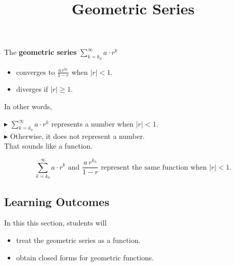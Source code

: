 \documentclass{ximera}
\title{Geometric Series}
\begin{document}
\begin{abstract}
\end{abstract}
\maketitle







\begin{theorem}
The \textbf{\textcolor{purple!85!blue}{geometric series}} $\sum\limits_{k= k_0}^\infty a \cdot r^k$ 
  
  \begin{itemize} 
  \item converges to $\frac{a \, r^{k_0}}{1-r}$ when $|r| < 1$.
  \item diverges if $|r| \geq 1$.  
  \end{itemize}
\end{theorem}




In other words, 


\textbf{\textcolor{blue!55!black}{$\blacktriangleright$}}   $\sum\limits_{k= k_0}^\infty a \cdot r^k$ represents a number when $|r| < 1$. \\

\textbf{\textcolor{blue!55!black}{$\blacktriangleright$}}  Otherwise, it does not represent a number. \\





That sounds like a function.



\[
\sum\limits_{k= k_0}^\infty a \cdot r^k  \text{ and } \frac{a \, r^{k_0}}{1-r} \text{ represent the same function when } |r| < 1.
\]





\subsection*{Learning Outcomes}

\begin{sectionOutcomes}
In this this section, students will  

\begin{itemize}
\item treat the geometric series as a function.
\item obtain closed forms for geometric functions.
\end{itemize}
\end{sectionOutcomes}
\end{document}
